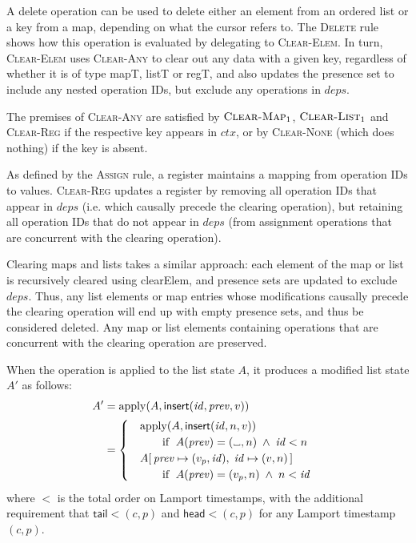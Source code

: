 \documentclass[10pt,journal,compsoc]{IEEEtran}
\newif\ifproofdraft
\newcommand{\placeholder}{%
  \makebox[0.7em]{%
    \kern.07em
    \vrule height.3ex
    \hrulefill
    \vrule height.3ex
    \kern.07em
  }%
}
\begin{document}
A \textsf{delete} operation can be used to delete either an element from an ordered list or a key from a map, depending on what the cursor refers to. The \textsc{Delete} rule shows how this operation is evaluated by delegating to \textsc{Clear-Elem}. In turn, \textsc{Clear-Elem} uses \textsc{Clear-Any} to clear out any data with a given key, regardless of whether it is of type \textsf{mapT}, \textsf{listT} or \textsf{regT}, and also updates the presence set to include any nested operation IDs, but exclude any operations in $\mathit{deps}$.

The premises of \textsc{Clear-Any} are satisfied by $\textsc{Clear-Map}_1$, $\textsc{Clear-List}_1$ and \textsc{Clear-Reg} if the respective key appears in $\mathit{ctx}$, or by \textsc{Clear-None} (which does nothing) if the key is absent.

As defined by the \textsc{Assign} rule, a register maintains a mapping from operation IDs to values. \textsc{Clear-Reg} updates a register by removing all operation IDs that appear in $\mathit{deps}$ (i.e. which causally precede the clearing operation), but retaining all operation IDs that do not appear in $\mathit{deps}$ (from assignment operations that are concurrent with the clearing operation).

Clearing maps and lists takes a similar approach: each element of the map or list is recursively cleared using \textsf{clearElem}, and presence sets are updated to exclude $\mathit{deps}$. Thus, any list elements or map entries whose modifications causally precede the clearing operation will end up with empty presence sets, and thus be considered deleted. Any map or list elements containing operations that are concurrent with the clearing operation are preserved.

\ifproofdraft

When the operation is applied to the list state $A$, it produces a modified list state $A'$ as follows:
\begin{align*}
A' &= \mathrm{apply}(A, \mathsf{insert}(\mathit{id}, \mathit{prev}, v)) \\ &=
\begin{cases}
\quad \mathrm{apply}(A, \mathsf{insert}(\mathit{id}, n, v)) \\
    \qquad\quad\text{if }\; A(\mathit{prev}) = (\placeholder, n) \;\wedge\; \mathit{id} < n \\
\quad A[\,\mathit{prev} \mapsto (v_p, \mathit{id}),\; \mathit{id} \mapsto (v, n)\,] \\
    \qquad\quad\text{if }\; A(\mathit{prev}) = (v_p, n) \;\wedge\; n < \mathit{id}
\end{cases}
\end{align*}
where $<$ is the total order on Lamport timestamps, with the additional requirement that $\mathsf{tail} < (c, p)$ and $\mathsf{head} < (c, p)$ for any Lamport timestamp $(c, p)$.
\end{document}

